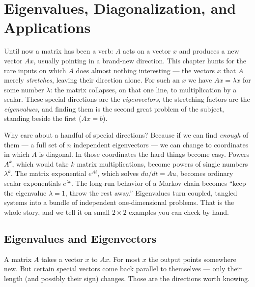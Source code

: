\chapter{Eigenvalues, Diagonalization, and Applications}
\label{ch:7}

Until now a matrix has been a verb: $A$ acts on a vector $x$ and produces a new vector $Ax$, usually pointing in a brand-new direction. This chapter hunts for the rare inputs on which $A$ does almost nothing interesting --- the vectors $x$ that $A$ merely \emph{stretches}, leaving their direction alone. For such an $x$ we have $Ax = \lambda x$ for some number $\lambda$: the matrix collapses, on that one line, to multiplication by a scalar. These special directions are the \emph{eigenvectors}, the stretching factors are the \emph{eigenvalues}, and finding them is the second great problem of the subject, standing beside the first ($Ax=b$).

Why care about a handful of special directions? Because if we can find \emph{enough} of them --- a full set of $n$ independent eigenvectors --- we can change to coordinates in which $A$ is diagonal. In those coordinates the hard things become easy. Powers $A^k$, which would take $k$ matrix multiplications, become powers of single numbers $\lambda^k$. The matrix exponential $e^{At}$, which solves $du/dt = Au$, becomes ordinary scalar exponentials $e^{\lambda t}$. The long-run behavior of a Markov chain becomes ``keep the eigenvalue $\lambda = 1$, throw the rest away.'' Eigenvalues turn coupled, tangled systems into a bundle of independent one-dimensional problems. That is the whole story, and we tell it on small $2\times2$ examples you can check by hand.

\section{Eigenvalues and Eigenvectors}

A matrix $A$ takes a vector $x$ to $Ax$. For most $x$ the output points somewhere new. But certain special vectors come back parallel to themselves --- only their length (and possibly their sign) changes. Those are the directions worth knowing.


